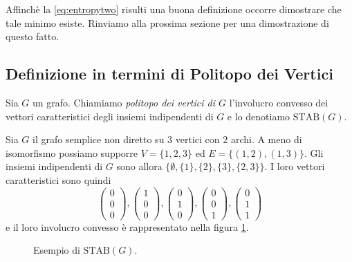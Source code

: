 Affinchè la \ref{eq:entropytwo} risulti una buona definizione occorre dimostrare che tale minimo esiste. Rinviamo alla prossima sezione per una dimostrazione di questo fatto.

\subsection{Definizione in termini di Politopo dei Vertici} 
\begin{definition}
  Sia \(G\) un grafo. Chiamiamo \emph{politopo dei vertici di \(G\)} l'involucro convesso dei vettori caratteristici degli insiemi indipendenti di \(G\) e lo denotiamo \(\text{STAB}(G)\). 
\end{definition}
\begin{example}
  Sia \(G\) il grafo semplice non diretto su \(3\) vertici con \(2\) archi. A meno di isomorfismo possiamo supporre \(V=\{1,2,3\}\) ed \(E=\{(1,2),(1,3)\}\). Gli insiemi indipendenti di \(G\) sono allora \(\{\emptyset , \{1\}, \{2\}, \{3\}, \{2,3\}\}\). I loro vettori caratteristici sono quindi
  \[ \left( 
  \begin{array}{c}
    0\\0\\0 
  \end{array}
  \right) , \left( 
  \begin{array}{c}
    1\\0\\0 
  \end{array}
  \right) , \left( 
  \begin{array}{c}
    0\\1\\0 
  \end{array}
  \right) , \left( 
  \begin{array}{c}
    0\\0\\1 
  \end{array}
  \right) , \left( 
  \begin{array}{c}
    0\\1\\1 
  \end{array}
  \right) \]
  e il loro involucro convesso è rappresentato nella figura \ref{stabexample}. 
  \begin{figure}
    \centering 
    \caption{Esempio di \(\text{STAB}(G)\).} \label{stabexample} 
  \end{figure}
\end{example}

